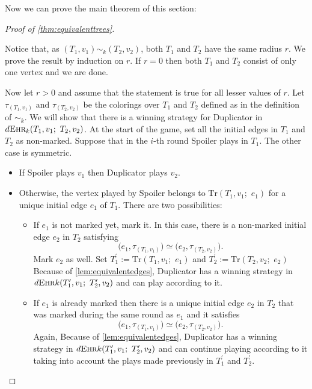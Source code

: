 \documentclass[12pt,notitlepage,a4paper]{article}
\theoremstyle{definition}
\newcommand{\morph}[1]{\sim_#1}
\newcommand{\ehr}{\textsc{Ehr}}
\begin{document}
Now we can prove the main theorem of this section:

\begin{proof}[Proof of \cref{thm:equivalenttrees}]~ \par
	Notice that, as $(T_1,v_1)\morph{k} (T_2,v_2)$, both $T_1$ and
	$T_2$ have the same radius $r$.
	We prove the result by induction on $r$.
	If $r=0$ then both $T_1$ and $T_2$ consist
	of only one vertex and we are done. \par
	Now let $r>0$ and assume that the 
	statement is true for all lesser values of $r$.
	Let $\tau_{(T_1,v_1)}$ and $\tau_{(T_2,v_2)}$ 
	be the colorings over $T_1$ and $T_2$ defined as in 
	the definition of $\sim_k$. 
	We will show that there is a winning strategy 
	for Duplicator in
	$d\ehr_k(T_1,v_1;\,\, T_2,v_2)$.
	At the start of the game, set all the initial edges
	in $T_1$ and $T_2$ as non-marked. 
	Suppose that in the $i$-th round Spoiler plays in 
	$T_1$. The other case is symmetric. 
	\begin{itemize}
		\item If Spoiler plays $v_1$ then Duplicator plays $v_2$.
		\item Otherwise, the vertex played by Spoiler belongs to
		$\mathrm{Tr}(T_1,v_1;\,\,e_1)$
		for a unique initial edge $e_1$ of $T_1$. 
		There are two possibilities:
		\begin{itemize}
			\item If $e_1$ is not marked yet, mark it. 
			In this case, there is a 
			non-marked initial
			edge $e_2$ in $T_2$ satisfying 
			\[
			\big(e_1,\tau_{(T_1,v_1)}\big)\simeq
			\big(e_2,\tau_{(T_2,v_2)}  \big).\]
			Mark $e_2$ as well. 
			Set $T^\prime_1:=\mathrm{Tr}(T_1,v_1;\,\,e_1)$
			and
			$T^\prime_2:=\mathrm{Tr}(T_2,v_2;\,\,e_2)$
			Because of
			\cref{lem:equivalentedges}, Duplicator
			has a winning strategy in
			$ d\ehr{k}(T^\prime_1, v_1; \,\, T^\prime_2,v_2)$
			and can play according to it.
			\item If $e_1$ is already marked then there is
			a unique initial edge $e_2$ in $T_2$ that was 
			marked during the same round as $e_1$ and it satisfies 
			\[
			\big(e_1,\tau_{(T_1,v_1)}\big)\simeq
			\big(e_2,\tau_{(T_2,v_2)}  \big).\]	
			Again, 
			Because of
			\cref{lem:equivalentedges}, Duplicator
			has a winning strategy in
			$d\ehr{k}(T^\prime_1, v_1; \,\, T^\prime_2,v_2)$
			and can continue playing according to it taking
			into account the plays made previously in 
			$T^\prime_1$ and $T^\prime_2$.	
		\end{itemize}
	\end{itemize}
\end{proof}
\end{document}
